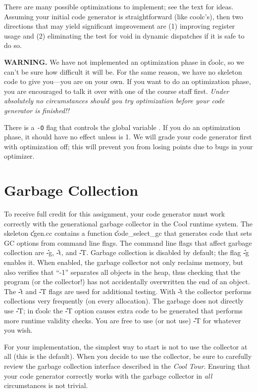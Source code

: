 There are many possible optimizations to implement; see the text for
ideas.  Assuming your initial code generator is straightforward (like
coolc's), then two directions that may yield significant
improvement are (1) improving register
usage and
(2) eliminating the test for void in dynamic dispatches if it is safe
to do so.

{\bf WARNING.} We have not implemented an optimization phase in \U{coolc},
so we can't be sure how difficult it will be.  For the same reason, we
have no skeleton code to give you---you are on your own.  If you want to
do an optimization phase, you are encouraged to talk it over with one
of the course staff first. {\em Under absolutely no circumstances should you try
optimization before your code generator is finished!!}

There is a {\tt -O} flag that controls the global variable
 .  If you do an optimization phase, it should have
 no effect unless  is 1.  We
 will grade your code generator first with optimization off; this will
 prevent you from losing points due to bugs in your optimizer.

\section{Garbage Collection}

To receive full credit for this assignment, your code generator must work
correctly with the generational garbage collector in the Cool runtime
system.  The skeleton \U{cgen.cc}  contains a function
\U{code\_select\_gc} that generates code that sets GC options
from command line flags.
The command line flags that affect garbage collection are \U{-g},
\U{-t}, and \U{-T}.  Garbage collection is disabled by default; the
flag \U{-g} enables it.  When enabled, the garbage collector
not only reclaims memory, but also verifies that ``-1'' separates all objects in the heap, thus checking
that the program (or the collector!) has not accidentally overwritten
the end of an object.  The \U{-t} and \U{-T} flags are used for additional
testing.  With \U{-t} the collector
performs collections very frequently (on every allocation).  The garbage
does not directly use \U{-T}; in \U{coolc} the \U{-T} option causes extra
code to be generated that performs more runtime validity checks.  You
are free to use (or not use) \U{-T} for whatever you wish.

For your implementation, the simplest way to start is not to use the
collector at all (this is the default).   When you decide to use the
collector, be sure to carefully review the garbage collection interface
described in the {\em Cool Tour}.   Ensuring that your code generator
correctly works with the garbage collector in {\em all} circumstances
is not trivial.



